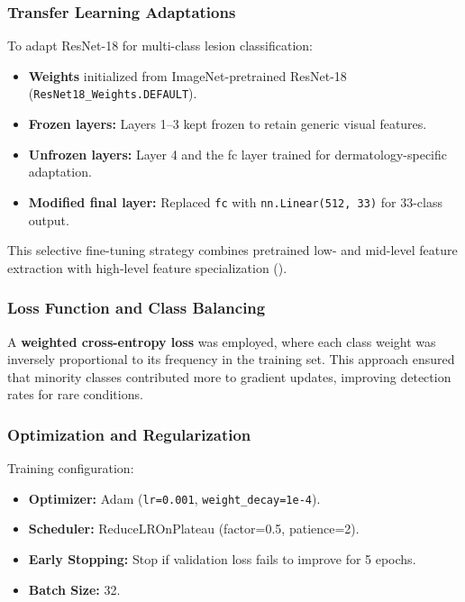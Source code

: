 \documentclass[
  12pt,
  oneside]{article}
\providecommand{\tightlist}{%
  \setlength{\itemsep}{0pt}\setlength{\parskip}{0pt}}
\begin{document}
\subsubsection{Transfer Learning
Adaptations}\label{transfer-learning-adaptations}

To adapt ResNet-18 for multi-class lesion classification:

\begin{itemize}
\tightlist
\item
  \textbf{Weights} initialized from ImageNet-pretrained ResNet-18
  (\texttt{ResNet18\_Weights.DEFAULT}).
\item
  \textbf{Frozen layers:} Layers 1--3 kept frozen to retain generic
  visual features.
\item
  \textbf{Unfrozen layers:} Layer 4 and the fc layer trained for
  dermatology-specific adaptation.
\item
  \textbf{Modified final layer:} Replaced \texttt{fc} with
  \texttt{nn.Linear(512,\ 33)} for 33-class output.
\end{itemize}

This selective fine-tuning strategy combines pretrained low- and
mid-level feature extraction with high-level feature specialization
().

\subsubsection{Loss Function and Class
Balancing}\label{loss-function-and-class-balancing}

A \textbf{weighted cross-entropy loss} was employed, where each class
weight was inversely proportional to its frequency in the training set.
This approach ensured that minority classes contributed more to gradient
updates, improving detection rates for rare conditions.

\subsubsection{Optimization and
Regularization}\label{optimization-and-regularization}

Training configuration:

\begin{itemize}
\tightlist
\item
  \textbf{Optimizer:} Adam (\texttt{lr=0.001},
  \texttt{weight\_decay=1e-4}).
\item
  \textbf{Scheduler:} ReduceLROnPlateau (factor=0.5, patience=2).
\item
  \textbf{Early Stopping:} Stop if validation loss fails to improve for
  5 epochs.
\item
  \textbf{Batch Size:} 32.
\end{itemize}
\end{document}
